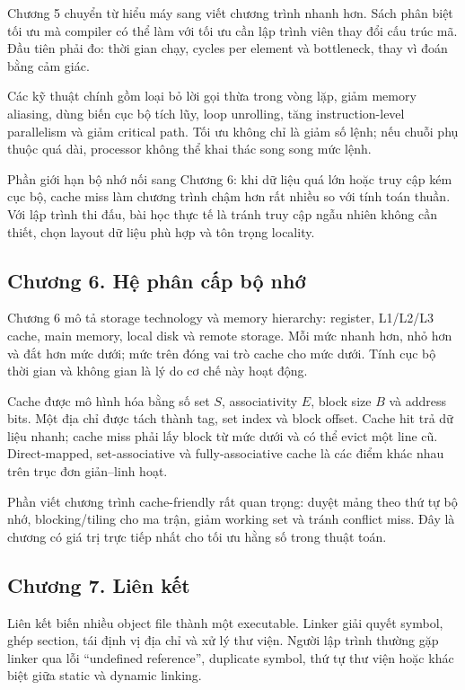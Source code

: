 \documentclass[11pt]{article}
\begin{document}
Chương 5 chuyển từ hiểu máy sang viết chương trình nhanh hơn. Sách phân biệt
tối ưu mà compiler có thể làm với tối ưu cần lập trình viên thay đổi cấu trúc
mã. Đầu tiên phải đo: thời gian chạy, cycles per element và bottleneck, thay vì
đoán bằng cảm giác.

Các kỹ thuật chính gồm loại bỏ lời gọi thừa trong vòng lặp, giảm memory aliasing,
dùng biến cục bộ tích lũy, loop unrolling, tăng instruction-level parallelism và
giảm critical path. Tối ưu không chỉ là giảm số lệnh; nếu chuỗi phụ thuộc quá
dài, processor không thể khai thác song song mức lệnh.

Phần giới hạn bộ nhớ nối sang Chương 6: khi dữ liệu quá lớn hoặc truy cập kém
cục bộ, cache miss làm chương trình chậm hơn rất nhiều so với tính toán thuần.
Với lập trình thi đấu, bài học thực tế là tránh truy cập ngẫu nhiên không cần
thiết, chọn layout dữ liệu phù hợp và tôn trọng locality.

\subsection*{Chương 6. Hệ phân cấp bộ nhớ}

Chương 6 mô tả storage technology và memory hierarchy: register, L1/L2/L3
cache, main memory, local disk và remote storage. Mỗi mức nhanh hơn, nhỏ hơn
và đắt hơn mức dưới; mức trên đóng vai trò cache cho mức dưới. Tính cục bộ
thời gian và không gian là lý do cơ chế này hoạt động.

Cache được mô hình hóa bằng số set \(S\), associativity \(E\), block size \(B\)
và address bits. Một địa chỉ được tách thành tag, set index và block offset.
Cache hit trả dữ liệu nhanh; cache miss phải lấy block từ mức dưới và có thể
evict một line cũ. Direct-mapped, set-associative và fully-associative cache là
các điểm khác nhau trên trục đơn giản--linh hoạt.

Phần viết chương trình cache-friendly rất quan trọng: duyệt mảng theo thứ tự
bộ nhớ, blocking/tiling cho ma trận, giảm working set và tránh conflict miss.
Đây là chương có giá trị trực tiếp nhất cho tối ưu hằng số trong thuật toán.

\subsection*{Chương 7. Liên kết}

Liên kết biến nhiều object file thành một executable. Linker giải quyết symbol,
ghép section, tái định vị địa chỉ và xử lý thư viện. Người lập trình thường gặp
linker qua lỗi ``undefined reference'', duplicate symbol, thứ tự thư viện hoặc
khác biệt giữa static và dynamic linking.
\end{document}
